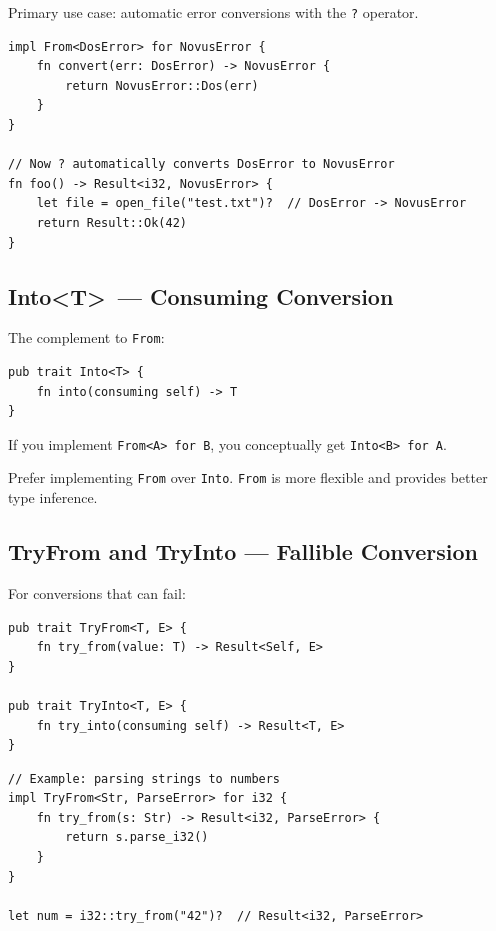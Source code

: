 Primary use case: automatic error conversions with the \texttt{?} operator.

\begin{lstlisting}
impl From<DosError> for NovusError {
    fn convert(err: DosError) -> NovusError {
        return NovusError::Dos(err)
    }
}

// Now ? automatically converts DosError to NovusError
fn foo() -> Result<i32, NovusError> {
    let file = open_file("test.txt")?  // DosError -> NovusError
    return Result::Ok(42)
}
\end{lstlisting}

\subsection{Into\textless T\textgreater\ --- Consuming Conversion}

The complement to \texttt{From}:

\begin{lstlisting}
pub trait Into<T> {
    fn into(consuming self) -> T
}
\end{lstlisting}

If you implement \texttt{From<A> for B}, you conceptually get \texttt{Into<B> for A}.

\begin{tipbox}
Prefer implementing \texttt{From} over \texttt{Into}. \texttt{From} is more flexible and provides better type inference.
\end{tipbox}

\subsection{TryFrom and TryInto --- Fallible Conversion}

For conversions that can fail:

\begin{lstlisting}
pub trait TryFrom<T, E> {
    fn try_from(value: T) -> Result<Self, E>
}

pub trait TryInto<T, E> {
    fn try_into(consuming self) -> Result<T, E>
}
\end{lstlisting}

\begin{lstlisting}
// Example: parsing strings to numbers
impl TryFrom<Str, ParseError> for i32 {
    fn try_from(s: Str) -> Result<i32, ParseError> {
        return s.parse_i32()
    }
}

let num = i32::try_from("42")?  // Result<i32, ParseError>
\end{lstlisting}

